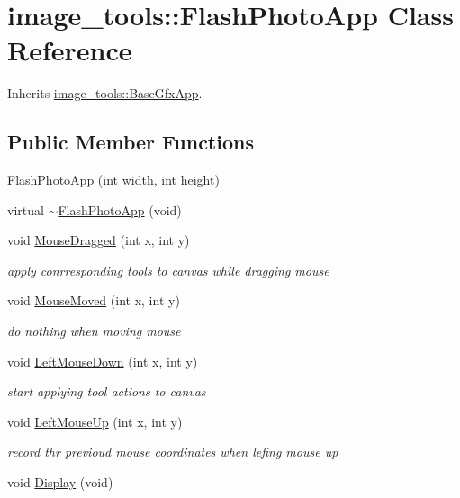 \hypertarget{classimage__tools_1_1FlashPhotoApp}{}\section{image\+\_\+tools\+:\+:Flash\+Photo\+App Class Reference}
\label{classimage__tools_1_1FlashPhotoApp}


Inherits \hyperlink{classimage__tools_1_1BaseGfxApp}{image\+\_\+tools\+::\+Base\+Gfx\+App}.

\subsection*{Public Member Functions}
\begin{DoxyCompactItemize}
\item 
\hyperlink{classimage__tools_1_1FlashPhotoApp_ae86078388c8a06bae8e708ed15ea4638}{Flash\+Photo\+App} (int \hyperlink{classimage__tools_1_1BaseGfxApp_a2fe403c5392f624477c2ce4429f1a7b5}{width}, int \hyperlink{classimage__tools_1_1BaseGfxApp_aa961e13a7a8e6062204223cc33ac7503}{height})
\item 
virtual \hyperlink{classimage__tools_1_1FlashPhotoApp_ae30fa92a77c73bee5afac2fe21829a2e}{$\sim$\+Flash\+Photo\+App} (void)
\item 
void \hyperlink{classimage__tools_1_1FlashPhotoApp_abe6a6b7ac7664639d5208affe277f6ee}{Mouse\+Dragged} (int x, int y)
\begin{DoxyCompactList}\small\item\em apply conrresponding tools to canvas while dragging mouse \end{DoxyCompactList}\item 
void \hyperlink{classimage__tools_1_1FlashPhotoApp_abac618c1f5a236dc678674de050cd205}{Mouse\+Moved} (int x, int y)
\begin{DoxyCompactList}\small\item\em do nothing when moving mouse \end{DoxyCompactList}\item 
void \hyperlink{classimage__tools_1_1FlashPhotoApp_a6ad65b17915b17d539bf82fb07710c7f}{Left\+Mouse\+Down} (int x, int y)
\begin{DoxyCompactList}\small\item\em start applying tool actions to canvas \end{DoxyCompactList}\item 
void \hyperlink{classimage__tools_1_1FlashPhotoApp_ab2fb593952915731ec50da0a4a20d097}{Left\+Mouse\+Up} (int x, int y)
\begin{DoxyCompactList}\small\item\em record thr previoud mouse coordinates when lefing mouse up \end{DoxyCompactList}\item 
void \hyperlink{classimage__tools_1_1FlashPhotoApp_a3ee0b08c0e7096652ef8dc549a684f76}{Display} (void)\hypertarget{classimage__tools_1_1FlashPhotoApp_a3ee0b08c0e7096652ef8dc549a684f76}{}\label{classimage__tools_1_1FlashPhotoApp_a3ee0b08c0e7096652ef8dc549a684f76}


\end{DoxyCompactItemize}
